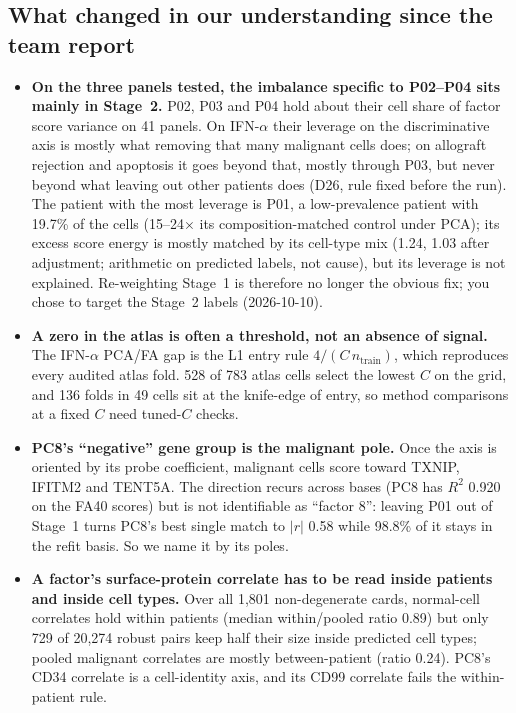 \subsection*{What changed in our understanding since the team report}

\begin{itemize}
\item \textbf{On the three panels tested, the imbalance specific to P02--P04 sits mainly in Stage~2.} P02, P03 and P04 hold about their cell share of factor score variance on 41 panels. On IFN-$\alpha$ their leverage on the discriminative axis is mostly what removing that many malignant cells does; on allograft rejection and apoptosis it goes beyond that, mostly through P03, but never beyond what leaving out other patients does (D26, rule fixed before the run). The patient with the most leverage is P01, a low-prevalence patient with 19.7\% of the cells (15--24$\times$ its composition-matched control under PCA); its excess score energy is mostly matched by its cell-type mix (1.24, 1.03 after adjustment; arithmetic on predicted labels, not cause), but its leverage is not explained. Re-weighting Stage~1 is therefore no longer the obvious fix; you chose to target the Stage~2 labels (2026-10-10). 
\item \textbf{A zero in the atlas is often a threshold, not an absence of signal.} The IFN-$\alpha$ PCA/FA gap is the L1 entry rule $4/(C\,n_{\text{train}})$, which reproduces every audited atlas fold. 528 of 783 atlas cells select the lowest $C$ on the grid, and 136 folds in 49 cells sit at the knife-edge of entry, so method comparisons at a fixed $C$ need tuned-$C$ checks. 
\item \textbf{PC8's ``negative'' gene group is the malignant pole.} Once the axis is oriented by its probe coefficient, malignant cells score toward TXNIP, IFITM2 and TENT5A. The direction recurs across bases (PC8 has $R^2$ 0.920 on the FA40 scores) but is not identifiable as ``factor 8'': leaving P01 out of Stage~1 turns PC8's best single match to $|r|$ 0.58 while 98.8\% of it stays in the refit basis. So we name it by its poles. 
\item \textbf{A factor's surface-protein correlate has to be read inside patients and inside cell types.} Over all 1,801 non-degenerate cards, normal-cell correlates hold within patients (median within/pooled ratio 0.89) but only 729 of 20,274 robust pairs keep half their size inside predicted cell types; pooled malignant correlates are mostly between-patient (ratio 0.24). PC8's CD34 correlate is a cell-identity axis, and its CD99 correlate fails the within-patient rule. 

\end{itemize}

